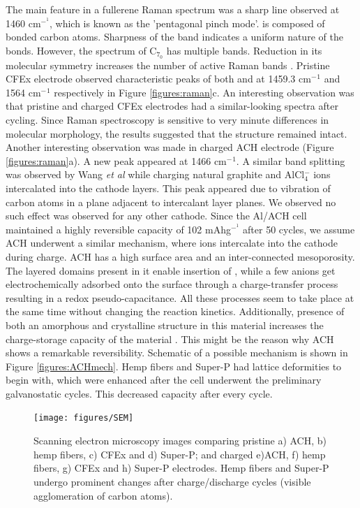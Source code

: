 The main feature in a fullerene Raman spectrum was a sharp line observed at 1460 cm$^-^1$, which is known as the 'pentagonal pinch mode'.  is composed of  bonded carbon atoms. Sharpness of the band indicates a uniform nature of the bonds. However, the spectrum of C$_7_0$ has multiple bands. Reduction in its molecular symmetry increases the number of active Raman bands \cite{kimbrell_analysis_2014}. Pristine CFEx electrode observed characteristic peaks of both  and  at 1459.3 cm$^-{^1}$ and 1564 cm$^-{^1}$ respectively in Figure \ref{figures:raman}c. An interesting observation was that pristine and charged CFEx electrodes had a similar-looking spectra after cycling. Since Raman spectroscopy is sensitive to very minute differences in molecular morphology, the results suggested that the structure remained intact. Another interesting observation was made in charged ACH electrode (Figure \ref{figures:raman}a). A new peak appeared at 1466 cm$^-{^1}$. A similar band splitting was observed by Wang \textit{et al} \cite{wang_kish_2017} while charging natural graphite and AlCl$_4^-$ ions intercalated into the cathode layers. This peak appeared due to vibration of carbon atoms in a plane adjacent to intercalant layer planes. We observed no such effect was observed for any other cathode. Since the Al/ACH cell maintained a highly reversible capacity of 102 mAhg$^-^1$ after 50 cycles, we assume ACH underwent a similar mechanism, where  ions intercalate into the cathode during charge. ACH has a high surface area and an inter-connected mesoporosity. The layered domains present in it enable insertion of , while a few anions get electrochemically adsorbed onto the surface through a charge-transfer process resulting in a redox pseudo-capacitance. All these processes seem to take place at the same time without changing the reaction kinetics. Additionally, presence of both an amorphous and crystalline structure in this material increases the charge-storage capacity of the material \cite{brezesinski_ordered_2010}. This might be the reason why ACH shows a remarkable reversibility. Schematic of a possible mechanism is shown in Figure \ref{figures:ACHmech}. Hemp fibers and Super-P had lattice deformities to begin with, which were enhanced after the cell underwent the preliminary galvanostatic cycles. This decreased capacity after every cycle. 
\begin{figure}[tbh!]
  \centering
  \texttt{[image: figures/SEM]}
    \caption{Scanning electron microscopy images comparing pristine a) ACH, b) hemp fibers, c) CFEx and d) Super-P; and charged e)ACH, f) hemp fibers, g) CFEx and h) Super-P electrodes. Hemp fibers and Super-P undergo prominent changes after charge/discharge cycles (visible agglomeration of carbon atoms).}
  \label{figures:SEM}
\end{figure}
